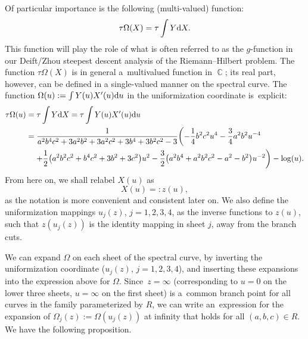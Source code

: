 \documentclass[10pt,a4paper]{amsart}
\DeclareMathOperator{\CC}{\mathbb{C}}
\numberwithin{equation}{section}
\begin{document}
Of particular importance is the following (multi-valued) function:
 \begin{equation*}
 \tau\Omega(X) = \tau\int Y {\rm d}X.
 \end{equation*}
This function will play the role of what is often referred to as the $g$-function in our Deift/Zhou steepest descent analysis of the Riemann--Hilbert problem. The function $\tau\Omega(X)$ is in general a~multivalued function in $\CC$; its real part, however, can be defined in a single-valued manner on the spectral curve. The function $\Omega(u) := \int Y(u) X'(u) {\rm d}u$ in the uniformization coordinate is~explicit:
 \begin{align}
 \tau \Omega(u)={}& \tau \int Y {\rm d}X = \tau \int Y(u) X'(u) {\rm d}u \nonumber\\
={}& \frac{1}{a^2b^4c^2 + 3a^2b^2 + 3a^2c^2 + 3b^4 + 3b^2c^2 - 3}\biggl(-\frac{1}{4} b^2c^2 u^4 - \frac{3}{4}a^2b^2 u^{-4}\label{Omega-uniformizer}\\
 &{}{+} \frac{1}{2}\bigl(a^2b^2c^2 + b^4c^2 + 3b^2 + 3c^2\bigr)u^2- \frac{3}{2}\bigl( a^2b^4 + a^2b^2c^2 - a^2 - b^2\bigr)u^{-2}\biggr) - \log(u).\nonumber
 \end{align}
From here on, we shall relabel $X(u)$ as
 \begin{equation*}
 X(u) =: z(u),
 \end{equation*}
as the notation is more convenient and consistent later on. We also define the uniformization mappings $u_j(z)$, $j=1,2,3,4$, as the inverse functions to $z(u)$, such that $z(u_j(z))$ is the identity mapping in sheet $j$, away from the branch cuts.

We can expand $\Omega$ on each sheet of the spectral curve, by inverting the uniformization coordinate ($u_j(z)$, $j=1,2,3,4$), and inserting these expansions into the expression above for $\Omega$. Since~${z=\infty}$ (corresponding to $u=0$ on the lower three sheets, $u=\infty$ on the first sheet) is a~common branch point for all curves in the family parameterized by $R$, we can write an~expression for the expansion of $\Omega_j(z) := \Omega(u_j(z))$ at infinity that holds for all $(a,b,c) \in R$. We have the following proposition.
\end{document}

